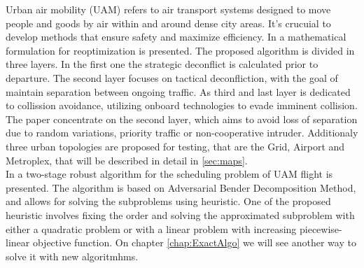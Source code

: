 \documentclass[../main.tex]{subfiles}
\begin{document}
Urban air mobility (UAM) refers to air transport systems designed to move people and goods by air within and around dense city areas. It's crucuial to develop methods that ensure safety and maximize efficiency.
In \cite{pelegrin-2023} a mathematical formulation for reoptimization is presented.
The proposed algorithm is divided in three layers. In the first one the strategic deconflict is calculated prior to departure.
The second layer focuses on tactical deconfliction, with the goal of maintain separation between ongoing traffic.
As third and last layer is dedicated to collission avoidance, utilizing onboard technologies to evade imminent collision.
The paper concentrate on the second layer, which aims to avoid loss of separation due to random variations, priority traffic or non-cooperative intruder.
Additionaly three urban topologies are proposed  for testing, that are the Grid, Airport and Metroplex, that will be described  in detail in \ref{sec:maps}.\\
In \cite{portoleau-2024} a two-stage robust algorithm for the scheduling problem of UAM flight is presented.
The algorithm is based on Adversarial Bender Decomposition Method, and allows for solving the subproblems using heuristic.
One of the proposed heuristic involves fixing the order and solving the approximated subproblem with either a quadratic problem or with a linear problem with increasing piecewise-linear objective function.
On chapter \ref{chap:ExactAlgo} we will see another way to solve it with new algoritmhms.
\end{document}
